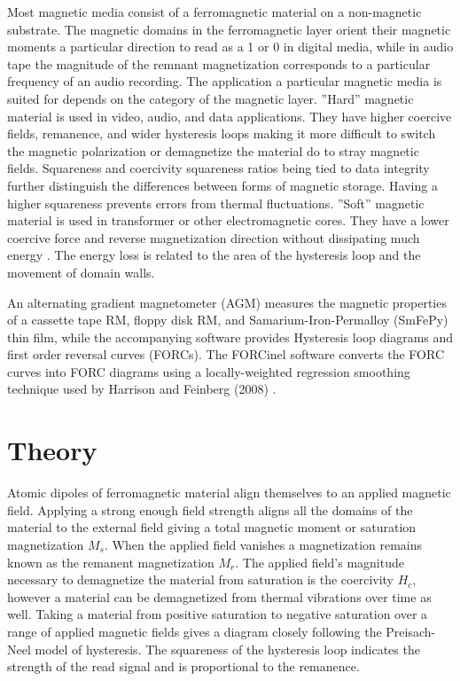\documentclass[aps,twocolumn,groupedaddress]{revtex4}
\begin{document}
Most magnetic media consist of a ferromagnetic material on a non-magnetic substrate. The magnetic domains in the ferromagnetic layer orient their magnetic moments a particular direction to read as a 1 or 0 in digital media, while in audio tape the magnitude of the remnant magnetization corresponds to a particular frequency of an audio recording. The application a particular magnetic media is suited for depends on the category of the magnetic layer. ''Hard'' magnetic material is used in video, audio, and data applications. They have higher coercive fields, remanence, and wider hysteresis loops making it more difficult to switch the magnetic polarization or demagnetize the material do to stray magnetic fields. Squareness and coercivity squareness ratios being tied to data integrity further distinguish the differences between forms of magnetic storage. Having a higher squareness prevents errors from thermal fluctuations. ''Soft'' magnetic material is used in transformer or other electromagnetic cores. They have a lower coercive force and reverse magnetization direction without dissipating much energy \cite{LEWIS}. The energy loss is related to the area of the hysteresis loop and the movement of domain walls. 

An alternating gradient magnetometer (AGM) measures the magnetic properties of a cassette tape RM, floppy disk RM, and Samarium-Iron-Permalloy (SmFePy) thin film, while the accompanying software provides Hysteresis loop diagrams and first order reversal curves (FORCs). The FORCinel software converts the FORC curves into FORC diagrams using a locally-weighted regression smoothing technique used by Harrison and Feinberg (2008)  \cite{HARRISON}.

\section{Theory}
Atomic dipoles of ferromagnetic material align themselves to an applied magnetic field. Applying a strong enough field strength aligns all the domains of the material to the external field giving a total magnetic moment or saturation magnetization $M_s$. When the applied field vanishes a magnetization remains known as the remanent magnetization $M_r$. The applied field’s magnitude necessary to demagnetize the material from saturation is the coercivity $H_c$, however a material can be demagnetized from thermal vibrations over time as well. Taking a material from positive saturation to negative saturation over a range of applied magnetic fields gives a diagram closely following the Preisach-Neel model of hysteresis. The squareness of the hysteresis loop indicates the strength of the read signal and is proportional to the remanence.
\end{document}
